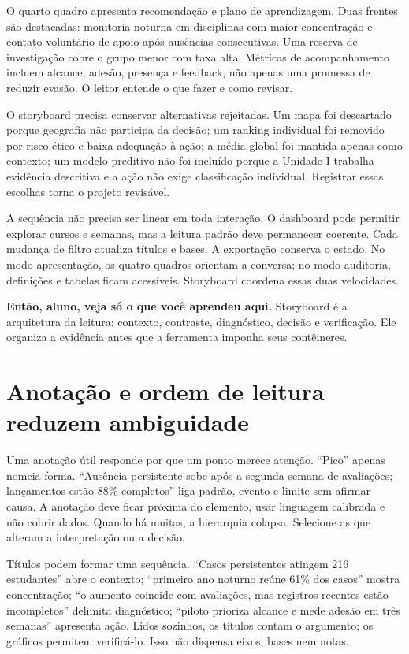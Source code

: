 O quarto quadro apresenta recomendação e plano de aprendizagem. Duas frentes são destacadas: monitoria noturna em disciplinas com maior concentração e contato voluntário de apoio após ausências consecutivas. Uma reserva de investigação cobre o grupo menor com taxa alta. Métricas de acompanhamento incluem alcance, adesão, presença e feedback, não apenas uma promessa de reduzir evasão. O leitor entende o que fazer e como revisar.

O storyboard precisa conservar alternativas rejeitadas. Um mapa foi descartado porque geografia não participa da decisão; um ranking individual foi removido por risco ético e baixa adequação à ação; a média global foi mantida apenas como contexto; um modelo preditivo não foi incluído porque a Unidade I trabalha evidência descritiva e a ação não exige classificação individual. Registrar essas escolhas torna o projeto revisável.

A sequência não precisa ser linear em toda interação. O dashboard pode permitir explorar cursos e semanas, mas a leitura padrão deve permanecer coerente. Cada mudança de filtro atualiza títulos e bases. A exportação conserva o estado. No modo apresentação, os quatro quadros orientam a conversa; no modo auditoria, definições e tabelas ficam acessíveis. Storyboard coordena essas duas velocidades.

\begin{SummaryBox}
\textbf{Então, aluno, veja só o que você aprendeu aqui.} Storyboard é a arquitetura da leitura: contexto, contraste, diagnóstico, decisão e verificação. Ele organiza a evidência antes que a ferramenta imponha seus contêineres.
\end{SummaryBox}

\section{Anotação e ordem de leitura reduzem ambiguidade}

Uma anotação útil responde por que um ponto merece atenção. ``Pico'' apenas nomeia forma. ``Ausência persistente sobe após a segunda semana de avaliações; lançamentos estão 88\% completos'' liga padrão, evento e limite sem afirmar causa. A anotação deve ficar próxima do elemento, usar linguagem calibrada e não cobrir dados. Quando há muitas, a hierarquia colapsa. Selecione as que alteram a interpretação ou a decisão.

Títulos podem formar uma sequência. ``Casos persistentes atingem 216 estudantes'' abre o contexto; ``primeiro ano noturno reúne 61\% dos casos'' mostra concentração; ``o aumento coincide com avaliações, mas registros recentes estão incompletos'' delimita diagnóstico; ``piloto prioriza alcance e mede adesão em três semanas'' apresenta ação. Lidos sozinhos, os títulos contam o argumento; os gráficos permitem verificá-lo. Isso não dispensa eixos, bases nem notas.

